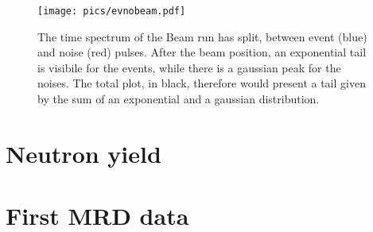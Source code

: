  \begin{figure}[]
   \centering
   \texttt{[image: pics/evnobeam.pdf]}
   \caption{The time spectrum of the Beam run has split, between event (blue) and noise (red) pulses.
     After the beam position, an exponential tail is visibile for the events, while there is a gaussian peak for %
     the noises.
     The total plot, in black, therefore would present a tail given by the sum of an exponential and %
     a gaussian distribution.}
   \label{fig:beamtail}
 \end{figure}





\section{Neutron yield}

\section{First MRD data}
